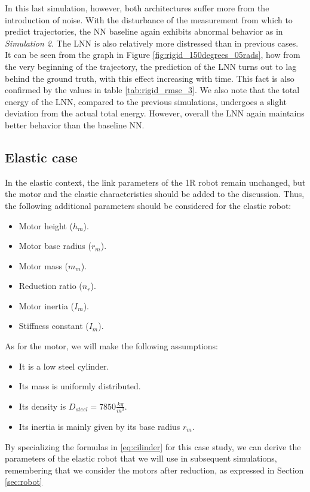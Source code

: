 \documentclass[a4paper]{article}
\begin{document}
In this last simulation, however, both architectures suffer more from the introduction of noise. With the disturbance of the measurement from which to predict trajectories, the NN baseline again exhibits abnormal behavior as in \textit{Simulation 2}. The LNN is also relatively more distressed than in previous cases. It can be seen from the graph in Figure \ref{fig:rigid_150degrees_05rads}, how from the very beginning of the trajectory, the prediction of the LNN turns out to lag behind the ground truth, with this effect increasing with time. This fact is also confirmed by the values in table \ref{tab:rigid_rmse_3}. We also note that the total energy of the LNN, compared to the previous simulations, undergoes a slight deviation from the actual total energy. However, overall the LNN again maintains better behavior than the baseline NN.



\subsection{Elastic case}
In the elastic context, the link parameters of the 1R robot remain unchanged, but the motor and the elastic characteristics should be added to the discussion. Thus, the following additional parameters should be considered for the elastic robot:

\begin{itemize}
    \item Motor height ($h_m$).
    \item Motor base radius ($r_m$).
    \item Motor mass ($m_m$).
    \item Reduction ratio ($n_r$).
    \item Motor inertia ($I_m$).
    \item Stiffness constant ($I_m$).
\end{itemize}

As for the motor, we will make the following assumptions:
\begin{itemize}
    \item It is a low steel cylinder.
    \item Its mass is uniformly distributed.
    \item Its density is $D_{steel}=7850 \frac{kg}{m^3}$.
    \item Its inertia is mainly given by its base radius $r_m$.
\end{itemize} 

By specializing the formulas in \eqref{eq:cilinder} for this case study, we can derive the parameters of the elastic robot that we will use in subsequent simulations, remembering that we consider the motors after reduction, as expressed in Section \ref{sec:robot}
\end{document}
